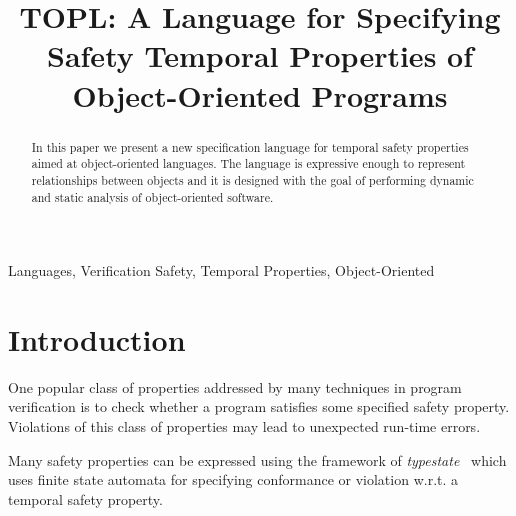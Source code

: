 \documentclass[preprint]{sigplanconf} %
\title{TOPL: A Language for Specifying Safety Temporal Properties of Object-Oriented Programs}
\theoremstyle{definition}
\begin{document}
\maketitle

\begin{abstract} %
In this paper we present a new specification language for temporal safety properties aimed at object-oriented languages.
The language is expressive enough to represent relationships between objects and it is designed with the goal of performing dynamic and static analysis of object-oriented software.
\end{abstract}
\terms Languages, Verification
\keywords Safety, Temporal Properties, Object-Oriented

\section{Introduction} %
One popular class of properties addressed by many techniques in program verification is to check whether a program satisfies some specified safety property.  
Violations of this class of properties may lead to unexpected run-time errors.

Many safety properties can be expressed using the framework of {\em typestate}~\cite{strom1986} which uses finite state automata for specifying conformance or violation w.r.t. a temporal safety property.
\end{document}

